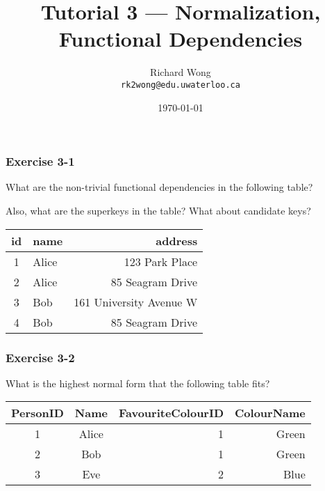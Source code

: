 

\title{Tutorial 3 --- Normalization, Functional Dependencies}

\author{Richard Wong \\ \small \texttt{rk2wong@edu.uwaterloo.ca}}
\date{\today}




\begin{frame}
  \titlepage

\end{frame}


\begin{frame}
\frametitle{Exercise 3-1}

What are the non-trivial functional dependencies in the following table?

Also, what are the superkeys in the table? What about candidate keys?

\begin{center}
  \begin{tabular}{||c l r||}
    \hline
    id & name & address \\ [0.5ex]
    \hline\hline
    1 & Alice & 123 Park Place \\
    \hline
    2 & Alice & 85 Seagram Drive \\
    \hline
    3 & Bob & 161 University Avenue W \\
    \hline
    4 & Bob & 85 Seagram Drive \\
    \hline
  \end{tabular}
\end{center}

\end{frame}


\begin{frame}
\frametitle{Exercise 3-2}

What is the highest normal form that the following table fits?

\begin{center}
  \begin{tabular}{||c c r r||}
    \hline
    PersonID & Name & FavouriteColourID & ColourName \\ [0.5ex]
    \hline\hline
    1 & Alice & 1 & Green \\
    \hline
    2 & Bob & 1 & Green \\
    \hline
    3 & Eve & 2 & Blue \\
    \hline
  \end{tabular}
\end{center}

\end{frame}


